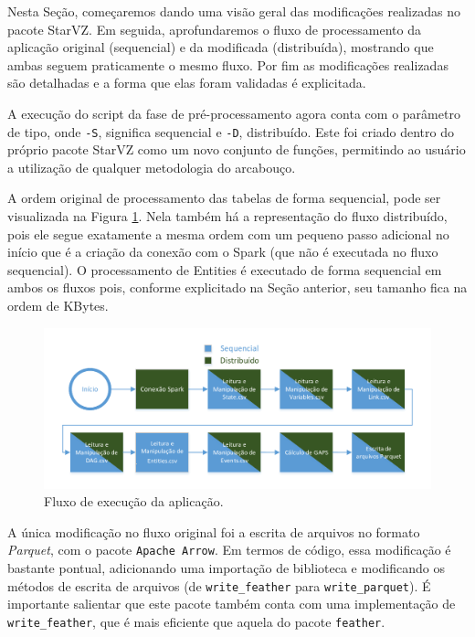 Nesta Seção, começaremos dando uma visão geral das modificações realizadas no 
pacote StarVZ. Em seguida, aprofundaremos o fluxo de processamento da aplicação 
original (sequencial) e da modificada (distribuída), mostrando que ambas seguem 
praticamente o mesmo fluxo. Por fim as modificações realizadas são detalhadas e 
a forma que elas foram validadas é explicitada.

A execução do script da fase de pré-processamento agora conta com o parâmetro de 
tipo, onde \texttt{-S}, significa sequencial e \texttt{-D}, distribuído. Este 
foi criado dentro do próprio pacote StarVZ como um novo conjunto de funções, 
permitindo ao usuário a utilização de qualquer metodologia do arcabouço.

A ordem original de processamento das tabelas de forma sequencial, pode ser 
visualizada na Figura \ref{fig:spark-starvz-flow}. Nela também há a 
representação do fluxo distribuído, pois ele segue exatamente a mesma ordem com 
um pequeno passo adicional no início que é a criação da conexão com o Spark 
(que não é executada no fluxo sequencial). O processamento de Entities é 
executado de forma sequencial em ambos os fluxos pois, conforme explicitado na 
Seção anterior, seu tamanho fica na ordem de KBytes.

\begin{figure}[H]
 \centerline{\includegraphics[width=1\textwidth]{./img/applicationflow.pdf}}
 \caption{Fluxo de execução da aplicação.}
 \label{fig:spark-starvz-flow}
\end{figure}

A única modificação no fluxo original foi a escrita de arquivos no formato 
\textit{Parquet}, com o pacote \texttt{Apache Arrow}. Em termos de código, essa 
modificação é bastante pontual, adicionando uma importação de biblioteca e 
modificando os métodos de escrita de arquivos (de \texttt{write\_feather} 
para \texttt{write\_parquet}). É importante salientar que este pacote também 
conta com uma implementação de \texttt{write\_feather}, que é mais eficiente 
que aquela do pacote \texttt{feather}.

